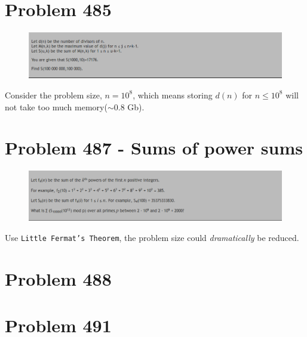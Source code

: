 \section{Problem 485}
\begin{prob}
	\begin{figure}[htb!]
		\begin{center}
			\includegraphics[scale = 0.4]{pic/485.png}
		\end{center}
	\end{figure}
\end{prob}
\begin{sol}
Consider the problem size, $n = 10^8$, which means storing $d(n)$ for $n \le 10^8$ will not take too much memory($\sim 0.8$ Gb). 
\end{sol}

\section{Problem 487 - Sums of power sums}
\begin{prob}
	\begin{figure}[htb!]
		\begin{center}
			\includegraphics[scale = 0.4]{pic/487.png}
		\end{center}
	\end{figure}
\end{prob}
\begin{sol}
Use \texttt{Little Fermat's Theorem}, the problem size could \textit{dramatically} be reduced.
\end{sol}

\section{Problem 488}
\section{Problem 491}
